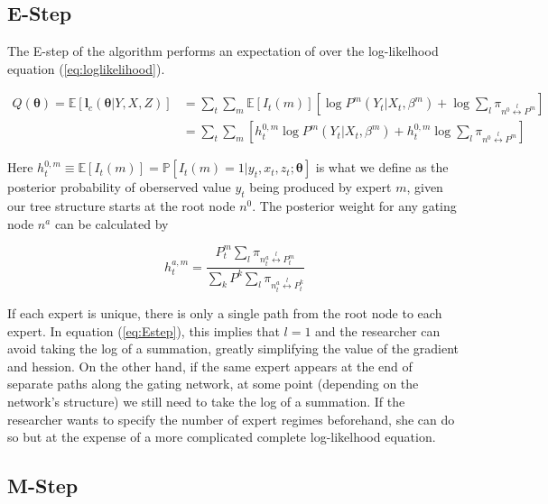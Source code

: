 \documentclass[12pt]{article}
\begin{document}
\subsection{E-Step}
The E-step of the algorithm performs an expectation of over the log-likelhood
equation (\ref{eq:loglikelihood}).

\begin{equation} \label{eq:Estep}
  \begin{split}
  Q(\boldsymbol{\theta}) = \mathbb{E}\left[\boldsymbol{l}_{c}(\boldsymbol{\theta}|Y,X,Z)\right] & = \sum_{t}\sum_{m} \mathbb{E}\left[I_{t}(m)\right] [\log P^{m}(Y_{t}|X_{t},\beta^{m}) + \log\sum_{l}\pi_{n^{0}\overset{l}{\longleftrightarrow} P^{m}}] \\
   & = \sum_{t}\sum_{m} [h^{0,m}_{t} \log P^{m}(Y_{t}|X_{t},\beta^{m}) + h^{0,m}_{t} \log \sum_{l}\pi_{n^{0}\overset{l}{\longleftrightarrow} P^{m}}]
 \end{split}
\end{equation}

Here $h^{0,m}_{t} \equiv \mathbb{E}\left[I_{t}(m)\right] = \mathbb{P}[I_{t}(m) = 1| y_{t}, x_{t}, z_{t}; \boldsymbol{\theta}]$
is what we define as the posterior probability of oberserved value $y_{t}$ being
produced by expert $m$, given our tree structure starts at the root node $n^{0}$.
The posterior weight for any gating node $n^{a}$ can be calculated by

\begin{equation} \label{eq:posteriornode}
  h^{a,m}_{t} = \frac{P^{m}_{t}\sum_{l}\pi_{n^{a}_{t}\overset{l}{\longleftrightarrow} P^{m}_{t}}}{\sum_{k}P^{k}\sum_{l}\pi_{n^{a}_{t}\overset{l}{\longleftrightarrow} P^{k}_{t}}}
\end{equation}

If each expert is unique, there is only a single path from the root node to each
expert. In equation (\ref{eq:Estep}), this implies that $l = 1$ and the researcher
can avoid taking the log of a summation, greatly simplifying the value of the
gradient and hession. On the other hand, if the same expert appears at the end of
separate paths along the gating network, at some point (depending on the network's
structure) we still need to take the log of a summation. If the researcher wants
to specify the number of expert regimes beforehand, she can do so but at the
expense of a more complicated complete log-likelhood equation.



\subsection{M-Step}
\end{document}
